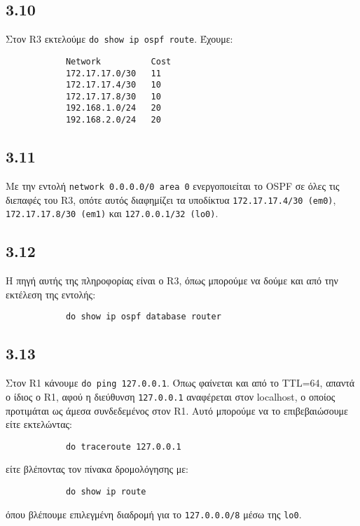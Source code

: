\documentclass[a4paper, 12pt]{article}
\begin{document}
	\subsection*{3.10}
		Στον R3 εκτελούμε \verb|do show ip ospf route|. Έχουμε:
		
		\begin{verbatim}
			Network          Cost
			172.17.17.0/30   11
			172.17.17.4/30   10
			172.17.17.8/30   10
			192.168.1.0/24   20
			192.168.2.0/24   20
		\end{verbatim}

	\subsection*{3.11}
		Με την εντολή \verb|network 0.0.0.0/0 area 0| ενεργοποιείται το OSPF σε όλες τις διεπαφές του R3, οπότε αυτός διαφημίζει τα υποδίκτυα \verb|172.17.17.4/30 (em0)|, \verb|172.17.17.8/30 (em1)| και \verb|127.0.0.1/32 (lo0)|.

	\subsection*{3.12}
		Η πηγή αυτής της πληροφορίας είναι ο R3, όπως μπορούμε να δούμε και από την εκτέλεση της εντολής:
		
		\begin{verbatim}
			do show ip ospf database router
		\end{verbatim}

	\subsection*{3.13}
		Στον R1 κάνουμε \verb|do ping 127.0.0.1|. Όπως φαίνεται και από το TTL=64, απαντά ο ίδιος ο R1, αφού η διεύθυνση \verb|127.0.0.1| αναφέρεται στον localhost, ο οποίος προτιμάται ως άμεσα συνδεδεμένος στον R1. Αυτό μπορούμε να το επιβεβαιώσουμε είτε εκτελώντας:
		
		\begin{verbatim}
			do traceroute 127.0.0.1
		\end{verbatim}
		
		είτε βλέποντας τον πίνακα δρομολόγησης με:
		
		\begin{verbatim}
			do show ip route
		\end{verbatim}
		 
		 όπου βλέπουμε επιλεγμένη διαδρομή για το \verb|127.0.0.0/8| μέσω της \verb|lo0|.
\end{document}
